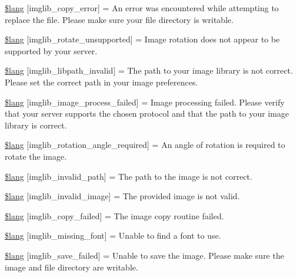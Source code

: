 \begin{DoxyCompactItemize}
\item 
\mbox{\hyperlink{imglib__lang_8php_abf9cda6847900e32a88f69ba0dc9a3f7}{\$lang}} \mbox{[}\textquotesingle{}imglib\+\_\+copy\+\_\+error\textquotesingle{}\mbox{]} = \textquotesingle{}An error was encountered while attempting to replace the file. Please make sure your file directory is writable.\textquotesingle{}
\item 
\mbox{\hyperlink{imglib__lang_8php_a45c4d46adade179aadaf31c3308dc817}{\$lang}} \mbox{[}\textquotesingle{}imglib\+\_\+rotate\+\_\+unsupported\textquotesingle{}\mbox{]} = \textquotesingle{}Image rotation does not appear to be supported by your server.\textquotesingle{}
\item 
\mbox{\hyperlink{imglib__lang_8php_ab93fcb81657fb28dae58c301fd86c239}{\$lang}} \mbox{[}\textquotesingle{}imglib\+\_\+libpath\+\_\+invalid\textquotesingle{}\mbox{]} = \textquotesingle{}The path to your image library is not correct. Please set the correct path in your image preferences.\textquotesingle{}
\item 
\mbox{\hyperlink{imglib__lang_8php_acd4bea80f16165e3fdacec4ef52098ba}{\$lang}} \mbox{[}\textquotesingle{}imglib\+\_\+image\+\_\+process\+\_\+failed\textquotesingle{}\mbox{]} = \textquotesingle{}Image processing failed. Please verify that your server supports the chosen protocol and that the path to your image library is correct.\textquotesingle{}
\item 
\mbox{\hyperlink{imglib__lang_8php_afc1a67705ef93541c57cabf37cac3502}{\$lang}} \mbox{[}\textquotesingle{}imglib\+\_\+rotation\+\_\+angle\+\_\+required\textquotesingle{}\mbox{]} = \textquotesingle{}An angle of rotation is required to rotate the image.\textquotesingle{}
\item 
\mbox{\hyperlink{imglib__lang_8php_ae146581692445d50a6f29581c9a1b829}{\$lang}} \mbox{[}\textquotesingle{}imglib\+\_\+invalid\+\_\+path\textquotesingle{}\mbox{]} = \textquotesingle{}The path to the image is not correct.\textquotesingle{}
\item 
\mbox{\hyperlink{imglib__lang_8php_a77429a4b0abf12636c198786dc433995}{\$lang}} \mbox{[}\textquotesingle{}imglib\+\_\+invalid\+\_\+image\textquotesingle{}\mbox{]} = \textquotesingle{}The provided image is not valid.\textquotesingle{}
\item 
\mbox{\hyperlink{imglib__lang_8php_a6261cfa91f0799188d8dcc0ba86180c5}{\$lang}} \mbox{[}\textquotesingle{}imglib\+\_\+copy\+\_\+failed\textquotesingle{}\mbox{]} = \textquotesingle{}The image copy routine failed.\textquotesingle{}
\item 
\mbox{\hyperlink{imglib__lang_8php_a6252e9edf6d856814555f9de3eedc8da}{\$lang}} \mbox{[}\textquotesingle{}imglib\+\_\+missing\+\_\+font\textquotesingle{}\mbox{]} = \textquotesingle{}Unable to find a font to use.\textquotesingle{}
\item 
\mbox{\hyperlink{imglib__lang_8php_a66c0d059360c1bd908fe612f9b3bf917}{\$lang}} \mbox{[}\textquotesingle{}imglib\+\_\+save\+\_\+failed\textquotesingle{}\mbox{]} = \textquotesingle{}Unable to save the image. Please make sure the image and file directory are writable.\textquotesingle{}
\end{DoxyCompactItemize}


